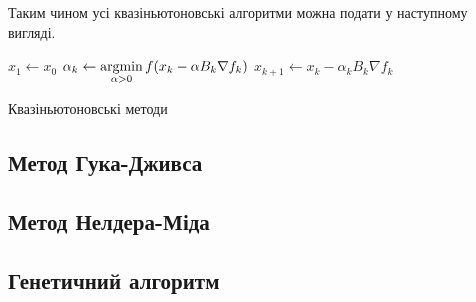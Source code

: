 Таким чином усі квазіньютоновські алгоритми можна подати у наступному
вигляді.

\begin{algorithm}[H] \label{alg:newton}
    \SetAlgoLined
    $x_1 \leftarrow x_0$\;
    {
        $\alpha_k \leftarrow \mathop{\mathrm{argmin}}\limits_{\alpha > 0} f(x_{k} - \alpha B_k \nabla f_{k})$\;
        $x_{k+1} \leftarrow x_{k} - \alpha_k B_k \nabla f_{k}$\;
    }
    \caption{Квазіньютоновські методи}
\end{algorithm}

\subsection*{Метод Гука-Дживса}

\subsection*{Метод Нелдера-Міда}

\subsection*{Генетичний алгоритм}
